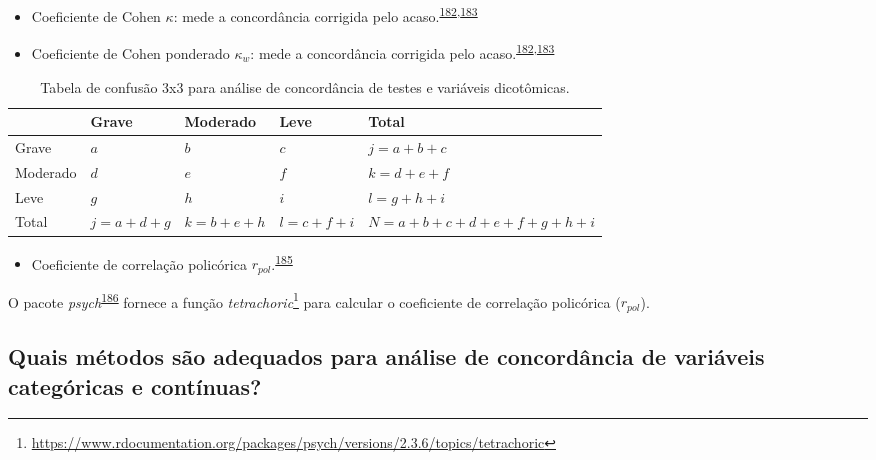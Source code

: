 \documentclass[
  a4paper,
]{book}
\providecommand{\tightlist}{%
  \setlength{\itemsep}{0pt}\setlength{\parskip}{0pt}}
\renewcommand{\href}[2]{#2\footnote{\url{#1}}}
\newenvironment{infobox}[1]
  {
  \begin{itemize}
  \renewcommand{\labelitemi}{
    \raisebox{-.7\height}[0pt][0pt]{
      {\setkeys{Gin}{width=3em,keepaspectratio}
        \texttt{[image: \#1]}}
    }
  }
  \setlength{\fboxsep}{1em}
  \begin{blackbox}
  \item
  }
  {
  \end{blackbox}
  \end{itemize}
  }
\begin{document}
\begin{itemize}
\item
  Coeficiente de Cohen \(\kappa\): mede a concordância corrigida pelo acaso.\textsuperscript{\protect\hyperlink{ref-scott1955}{182},\protect\hyperlink{ref-cohen1960}{183}}
\item
  Coeficiente de Cohen ponderado \(\kappa_{w}\): mede a concordância corrigida pelo acaso.\textsuperscript{\protect\hyperlink{ref-scott1955}{182},\protect\hyperlink{ref-cohen1960}{183}}
\end{itemize}

\begin{table}

\caption{\label{tab:crosstable-kappa-3x3}Tabela de confusão 3x3 para análise de concordância de testes e variáveis dicotômicas.}
\centering
\begin{tabu} to 
\toprule
\textbf{ } & \textbf{Grave} & \textbf{Moderado} & \textbf{Leve} & \textbf{Total}\\
\midrule
Grave & $a$ & $b$ & $c$ & $j=a+b+c$\\
Moderado & $d$ & $e$ & $f$ & $k=d+e+f$\\
Leve & $g$ & $h$ & $i$ & $l=g+h+i$\\
Total & $j=a+d+g$ & $k=b+e+h$ & $l=c+f+i$ & $N=a+b+c+d+e+f+g+h+i$\\
\bottomrule
\end{tabu}
\end{table}

\begin{itemize}
\tightlist
\item
  Coeficiente de correlação policórica \(r_{pol}\).\textsuperscript{\protect\hyperlink{ref-banerjee1999}{185}}
\end{itemize}

\begin{infobox}{images/Rlogo}
O pacote \emph{psych}\textsuperscript{\protect\hyperlink{ref-psych}{186}} fornece a função \href{https://www.rdocumentation.org/packages/psych/versions/2.3.6/topics/tetrachoric}{\emph{tetrachoric}} para calcular o coeficiente de correlação policórica (\(r_{pol}\)).

\end{infobox}

\hypertarget{quais-muxe9todos-suxe3o-adequados-para-anuxe1lise-de-concorduxe2ncia-de-variuxe1veis-categuxf3ricas-e-contuxednuas}{%
\subsection{Quais métodos são adequados para análise de concordância de variáveis categóricas e contínuas?}\label{quais-muxe9todos-suxe3o-adequados-para-anuxe1lise-de-concorduxe2ncia-de-variuxe1veis-categuxf3ricas-e-contuxednuas}}
\end{document}
